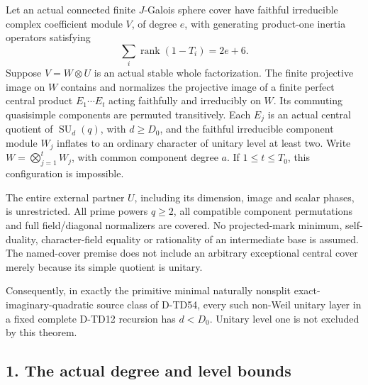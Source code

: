 \begin{theorem}[D-TD68]
Let an actual connected finite \(J\)-Galois sphere cover have faithful
irreducible complex coefficient module \(V\), of degree \(e\), with
generating product-one inertia operators satisfying
\[
                       \sum_i\operatorname{rank}(1-T_i)=2e+6.
 \tag{UPL.2}
\]
Suppose \(V=W\otimes U\) is an actual stable whole factorization.
The finite projective image on \(W\) contains and normalizes the
projective image of a finite perfect central product
\(E_1\cdots E_t\) acting faithfully and irreducibly on \(W\).
Its commuting quasisimple components are permuted transitively.
Each \(E_j\) is an actual central quotient of
\(\operatorname{SU}_d(q)\), with \(d\ge D_0\), and the faithful
irreducible component module \(W_j\) inflates to an ordinary character
of unitary level at least two. Write
\(W=\bigotimes_{j=1}^tW_j\), with common component degree \(a\).
If \(1\le t\le T_0\), this configuration is impossible.

The entire external partner \(U\), including its dimension, image and
scalar phases, is unrestricted. All prime powers \(q\ge2\), all
compatible component permutations and full field/diagonal normalizers
are covered. No projected-mark minimum, self-duality, character-field
equality or rationality of an intermediate base is assumed.
The named-cover premise does not include an arbitrary exceptional
central cover merely because its simple quotient is unitary.

Consequently, in exactly the primitive minimal naturally nonsplit
exact-imaginary-quadratic source class of D-TD54, every such non-Weil
unitary layer in a fixed complete D-TD12 recursion has \(d<D_0\).
Unitary level one is not excluded by this theorem.
\end{theorem}

\subsection*{1. The actual degree and level bounds}

